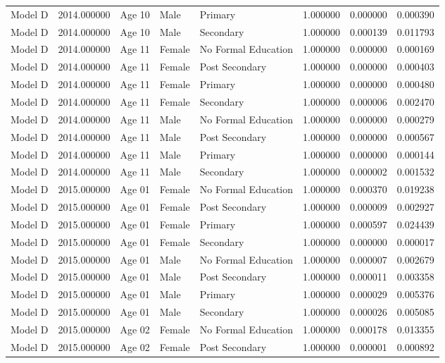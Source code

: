 \begin{table}[ht]
\begin{tabular}{lrlllrrr}
Model D & 2014.000000 & Age 10 & Male & Primary & 1.000000 & 0.000000 & 0.000390 \\
Model D & 2014.000000 & Age 10 & Male & Secondary & 1.000000 & 0.000139 & 0.011793 \\
Model D & 2014.000000 & Age 11 & Female & No Formal Education & 1.000000 & 0.000000 & 0.000169 \\
Model D & 2014.000000 & Age 11 & Female & Post Secondary & 1.000000 & 0.000000 & 0.000403 \\
Model D & 2014.000000 & Age 11 & Female & Primary & 1.000000 & 0.000000 & 0.000480 \\
Model D & 2014.000000 & Age 11 & Female & Secondary & 1.000000 & 0.000006 & 0.002470 \\
Model D & 2014.000000 & Age 11 & Male & No Formal Education & 1.000000 & 0.000000 & 0.000279 \\
Model D & 2014.000000 & Age 11 & Male & Post Secondary & 1.000000 & 0.000000 & 0.000567 \\
Model D & 2014.000000 & Age 11 & Male & Primary & 1.000000 & 0.000000 & 0.000144 \\
Model D & 2014.000000 & Age 11 & Male & Secondary & 1.000000 & 0.000002 & 0.001532 \\
Model D & 2015.000000 & Age 01 & Female & No Formal Education & 1.000000 & 0.000370 & 0.019238 \\
Model D & 2015.000000 & Age 01 & Female & Post Secondary & 1.000000 & 0.000009 & 0.002927 \\
Model D & 2015.000000 & Age 01 & Female & Primary & 1.000000 & 0.000597 & 0.024439 \\
Model D & 2015.000000 & Age 01 & Female & Secondary & 1.000000 & 0.000000 & 0.000017 \\
Model D & 2015.000000 & Age 01 & Male & No Formal Education & 1.000000 & 0.000007 & 0.002679 \\
Model D & 2015.000000 & Age 01 & Male & Post Secondary & 1.000000 & 0.000011 & 0.003358 \\
Model D & 2015.000000 & Age 01 & Male & Primary & 1.000000 & 0.000029 & 0.005376 \\
Model D & 2015.000000 & Age 01 & Male & Secondary & 1.000000 & 0.000026 & 0.005085 \\
Model D & 2015.000000 & Age 02 & Female & No Formal Education & 1.000000 & 0.000178 & 0.013355 \\
Model D & 2015.000000 & Age 02 & Female & Post Secondary & 1.000000 & 0.000001 & 0.000892 \\

\end{tabular}
\end{table}
